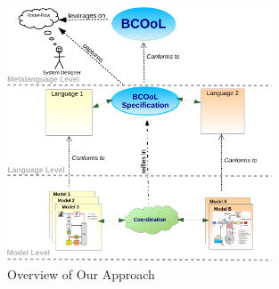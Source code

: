 \begin{figure}
\begin{center}
\includegraphics[width=0.7\textwidth]{background/figs/bcoolapp}
\caption{Overview of Our Approach}
\label{fig:bcoolapp}
\end{center}
\end{figure}	


